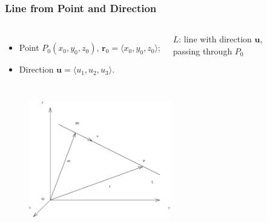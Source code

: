 \begin{frame}
   \frametitle{Line from Point and Direction}
\begin{columns}
  \column{6cm}
\begin{itemize}
 \item Point $P_0(x_0,y_0,z_0)$, $\textbf{r}_0=\langle x_0,y_0,z_0\rangle$;
\item Direction $\textbf{u}=\langle u_1,u_2,u_3\rangle$.
\end{itemize}
  \column{5cm}
 $L$: line with direction $\textbf{u}$, \\passing through $P_0$
\end{columns}

\begin{columns}
  \column{6cm}

  \column{6.5cm}
    \begin{figure}
        \includegraphics[height=2in]{../../modules/vectors/pictures/ok-line_point_direction_scalar.eps}
    \end{figure}
\end{columns}
\end{frame}


